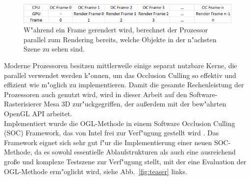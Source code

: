 \documentclass[journal]{vgtc}
\begin{document}
\begin{figure}%
\includegraphics[width=\columnwidth]{images/Ablauf.PNG}%
\caption{W"ahrend ein Frame gerendert wird, berechnet der Prozessor parallel zum Rendering bereits, welche Objekte in der n"achsten Szene zu sehen sind.}%
\label{fig:ablauf}%
\end{figure}

Moderne Prozessoren besitzen mittlerweile einige separat nutzbare Kerne, die parallel verwendet werden k"onnen, um das Occlusion Culling so effektiv und effizient wie m"oglich zu implementieren.
Damit die gesamte Rechenleistung der Prozessoren auch genutzt wird, wird in dieser Arbeit auf den Software-Rasterisierer Mesa 3D zur"uckgegriffen, der au{\ss}erdem mit der bew"ahrten OpenGL API arbeitet. \\

Implementiert wurde die OGL-Methode in einem Software Occlusion Culling (SOC) Framework, das von Intel frei zur Verf"ugung gestellt wird \cite{SOCF}.
Das Framework eignet sich sehr gut f"ur die Implementierung einer neuen SOC-Methode, da es sowohl essentielle Ablaufstrukturen als auch eine ausreichend gro{\ss}e und komplexe Testszene zur Verf"ugung stellt, mit der eine Evaluation der OGL-Methode erm"oglicht wird, siehe Abb.\ \ref{fig:teaser} links.
\end{document}
